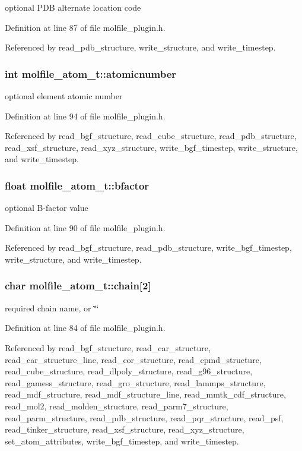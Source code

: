 optional PDB alternate location code 

Definition at line 87 of file molfile\_\-plugin.h.

Referenced by read\_\-pdb\_\-structure, write\_\-structure, and write\_\-timestep.
\subsubsection{\setlength{\rightskip}{0pt plus 5cm}int molfile\_\-atom\_\-t::atomicnumber}\label{structmolfile__atom__t_m13}


optional element atomic number 

Definition at line 94 of file molfile\_\-plugin.h.

Referenced by read\_\-bgf\_\-structure, read\_\-cube\_\-structure, read\_\-pdb\_\-structure, read\_\-xsf\_\-structure, read\_\-xyz\_\-structure, write\_\-bgf\_\-timestep, write\_\-structure, and write\_\-timestep.
\subsubsection{\setlength{\rightskip}{0pt plus 5cm}float molfile\_\-atom\_\-t::bfactor}\label{structmolfile__atom__t_m9}


optional B-factor value 

Definition at line 90 of file molfile\_\-plugin.h.

Referenced by read\_\-bgf\_\-structure, read\_\-pdb\_\-structure, write\_\-bgf\_\-timestep, write\_\-structure, and write\_\-timestep.
\subsubsection{\setlength{\rightskip}{0pt plus 5cm}char molfile\_\-atom\_\-t::chain[2]}\label{structmolfile__atom__t_m5}


required chain name, or \char`\"{}\char`\"{} 

Definition at line 84 of file molfile\_\-plugin.h.

Referenced by read\_\-bgf\_\-structure, read\_\-car\_\-structure, read\_\-car\_\-structure\_\-line, read\_\-cor\_\-structure, read\_\-cpmd\_\-structure, read\_\-cube\_\-structure, read\_\-dlpoly\_\-structure, read\_\-g96\_\-structure, read\_\-gamess\_\-structure, read\_\-gro\_\-structure, read\_\-lammps\_\-structure, read\_\-mdf\_\-structure, read\_\-mdf\_\-structure\_\-line, read\_\-mmtk\_\-cdf\_\-structure, read\_\-mol2, read\_\-molden\_\-structure, read\_\-parm7\_\-structure, read\_\-parm\_\-structure, read\_\-pdb\_\-structure, read\_\-pqr\_\-structure, read\_\-psf, read\_\-tinker\_\-structure, read\_\-xsf\_\-structure, read\_\-xyz\_\-structure, set\_\-atom\_\-attributes, write\_\-bgf\_\-timestep, and write\_\-timestep.
